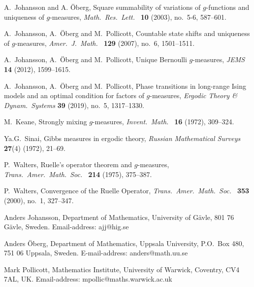 \documentclass[11pt, a4paper]{amsart}
\theoremstyle{definition}
\theoremstyle{remark}
\begin{document}
\begin{thebibliography}{999}
 A.\ Johansson and A. \"Oberg, Square summability of
  variations of $g$-functions and uniqueness of $g$-measures, {\em
    Math.\ Res.\ Lett.\ } {\bf 10} (2003), no.\ 5-6, 587--601.
    
 A.\ Johansson, A.\ \"Oberg and M.\ Pollicott,
  Countable state shifts and uniqueness of $g$-measures, {\em Amer.\
    J.\ Math.\ } {\bf 129} (2007), no.\ 6, 1501--1511.

 A.\ Johansson, A.\ \"Oberg and M.\ Pollicott, 
Unique Bernoulli $g$-measures, {\em JEMS} {\bf 14} (2012), 1599--1615.

 A.\ Johansson, A.\ \"Oberg and M.\ Pollicott, 
Phase transitions in long-range Ising models and an optimal 
condition for factors of $g$-measures, {\em Ergodic Theory \& Dynam.\ Systems}
{\bf 39} (2019), no.\ 5, 1317--1330.

  
 M.\ Keane, Strongly mixing $g$-measures, {\em Invent.\
    Math.\ } {\bf 16} (1972), 309--324.

Ya.G.\ Sinai, Gibbs measures in ergodic theory, {\em Russian Mathematical Surveys} {\bf 27}(4) (1972), 21--69. 

\bibitem{walters1}
P.\ Walters, Ruelle's operator theorem and $g$-measures, {\em Trans.\ Amer.\ Math.\ Soc.\ } {\bf 214} (1975), 375--387.

\bibitem{walters3}
P.\ Walters, Convergence of the Ruelle Operator, {\em Trans.\ Amer.\ Math.\ Soc.\ } {\bf 353} (2000), 
no.\ 1, 327--347.
\end{thebibliography}


\noindent
Anders Johansson, Department of Mathematics, University of G\"avle,
801 76 G\"avle, Sweden. Email-address: ajj@hig.se\newline

\noindent
Anders \"Oberg, Department of Mathematics, Uppsala University, P.O.\
Box 480, 751 06 Uppsala, Sweden. E-mail-address:
anders@math.uu.se\newline

\noindent
Mark Pollicott, Mathematics Institute, University of Warwick,
Coventry, CV4 7AL, UK. Email-address: mpollic@maths.warwick.ac.uk\newline
\end{document}
